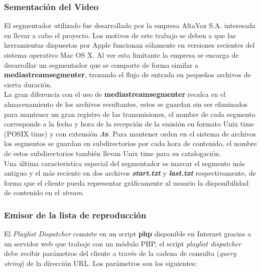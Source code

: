		\subsubsection{Sementación del Video}

El segmentador utilizado fue desarrollado por la empresa AltaVoz S.A. interesada en llevar a cabo el proyecto. Los motivos de este trabajo se deben a que las herramientas dispuestas por Apple funcionan sólamente en versiones recientes del sistema operativo Mac OS X. Al ver esta limitante la empresa se encarga de desarrollar un segmentador que se comporte de forma similar a \textbf{mediastreamsegmenter}, trozando el flujo de entrada en pequeños archivos de cierta duración.\\

 La gran diferencia con el uso de \textbf{mediastreamsegmenter} recalca en el almacenamiento de los archivos resultantes, estos se guardan sin ser eliminados para mantener un gran registro de las transmisiones, el nombre de cada segmento corresponde a la fecha y hora de la recepción de la emisión en formato Unix time (POSIX time) y con extensión \textbf{.ts}. Para mantener orden en el sistema de archivos los segmentos se guardan en subdirectorios por cada hora de contenido, el nombre de estos subdirectorios también llevan Unix time para su catalogación.\\

Una última caracteristica especial del segmentador es marcar el segmento más antiguo y el más reciente en dos archivos \textbf{\textit{start.txt}} y \textbf{\textit{last.txt}} respectivamente, de forma que el cliente pueda representar gráficamente al usuario la disponibilidad de contenido en el \textit{stream}.
		
		\subsubsection{Emisor de la lista de reproducción}
El \textit{Playlist Dispatcher} consiste en un script \textbf{php} disponible en Internet gracias a un servidor web que trabaje con un módulo PHP, el script \textit{playlist dispatcher} debe recibir parámetros del cliente a través de la cadena de consulta (\textit{query string}) de la dirección URL. Los parámetros son los siguientes:

